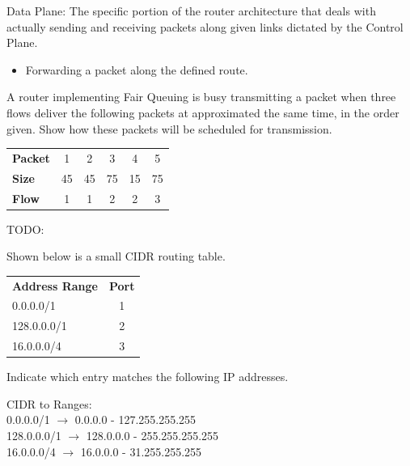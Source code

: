 \documentclass[12pt,addpoints,answers]{exam}
\begin{document}
\begin{questions}
\begin{solution}[3in]
	Data Plane: The specific portion of the router architecture that deals with actually sending and receiving packets along given links dictated by the Control Plane.
	\begin{itemize}
		\item Forwarding a packet along the defined route. 
	\end{itemize}
\end{solution}


\question[10] A router implementing Fair Queuing is busy transmitting a packet when three flows deliver the following packets at approximated the same time, in the order given. Show how these packets will be scheduled for transmission.
\begin{center}
\begin{tabular}{lccccc}
\toprule
\textbf{Packet} &  1 &  2 &  3 &  4 &  5 \\
\textbf{Size}   & 45 & 45 & 75 & 15 & 75 \\
\textbf{Flow}   &  1 &  1 &  2 &  2 &  3 \\
\bottomrule
\end{tabular}
\end{center}
\begin{solution}[2.5in]
	TODO:
\end{solution}

\question Shown below is a small CIDR routing table.
\begin{center}
\begin{tabular}{lc}
\toprule
\textbf{Address Range} & \textbf{Port} \\
0.0.0.0/1   & 1 \\
128.0.0.0/1 & 2 \\
16.0.0.0/4  & 3 \\
\bottomrule
\end{tabular}
\end{center}
Indicate which entry matches the following IP addresses.
\begin{center}
	CIDR to Ranges: \\
	0.0.0.0/1   $\rightarrow$ 0.0.0.0 - 127.255.255.255 \\
	128.0.0.0/1 $\rightarrow$ 128.0.0.0 - 255.255.255.255 \\
	16.0.0.0/4  $\rightarrow$ 16.0.0.0 - 31.255.255.255 \\
\end{center}
\end{questions}
\end{document}
